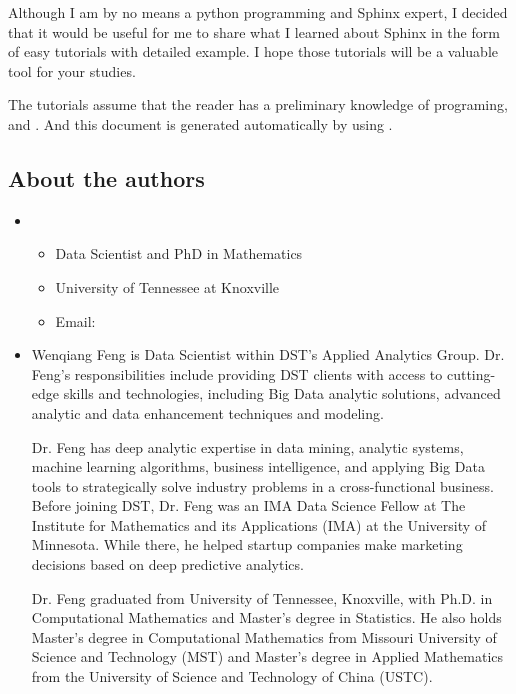 \documentclass[letterpaper,12pt,english]{sphinxmanual}
\begin{document}
Although I am by no means a python programming and Sphinx expert,
I decided that it would be useful for me to share what I learned
about Sphinx in the form of easy tutorials with detailed example.
I hope those tutorials will be a valuable tool for your studies.

The tutorials assume that the reader has a preliminary knowledge of  programing,  and . And this document is generated automatically by using .


\subsection{About the authors}
\label{\detokenize{preface:about-the-authors}}\begin{itemize}
\item {} 
\begin{itemize}
\item {} 
Data Scientist and PhD in Mathematics

\item {} 
University of Tennessee at Knoxville

\item {} 
Email: 

\end{itemize}

\item {} 

Wenqiang Feng is Data Scientist within DST’s Applied Analytics Group. Dr. Feng’s responsibilities include providing DST clients with access to cutting-edge skills and technologies, including Big Data analytic solutions, advanced analytic and data enhancement techniques and modeling.

Dr. Feng has deep analytic expertise in data mining, analytic systems, machine learning algorithms, business intelligence, and applying Big Data tools to strategically solve industry problems in a cross-functional business. Before joining DST, Dr. Feng was an IMA Data Science Fellow at The Institute for Mathematics and its Applications (IMA) at the University of Minnesota. While there, he helped startup companies make marketing decisions based on deep predictive analytics.

Dr. Feng graduated from University of Tennessee, Knoxville, with Ph.D. in Computational Mathematics and Master’s degree in Statistics. He also holds Master’s degree in Computational Mathematics from Missouri University of Science and Technology (MST) and Master’s degree in Applied Mathematics from the University of Science and Technology of China (USTC).


\end{itemize}
\end{document}
